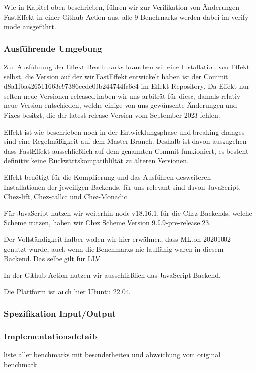Wie in %
Kapitel oben beschrieben, führen wir zur Verifikation von Änderungen FastEffekt in einer Github Action aus, alle 9 Benchmarks werden dabei im verify-mode ausgeführt. 

\subsubsection{Ausführende Umgebung}
Zur Ausführung der Effekt Benchmarks brauchen wir eine Installation von Effekt selbst, die Version auf der wir FastEffekt entwickelt haben ist der Commit d8a1fba426511663c97386eedc00b244744fa6e4 im Effekt Repository.
Da Effekt nur selten neue Versionen released haben wir uns arbiträt für diese, damals relativ neue Version entschieden, welche einige von uns gewünschte Änderungen und Fixes besitzt, die der latest-release Version vom September 2023 fehlen.

Effekt ist wie beschrieben noch in der Entwicklungsphase und breaking changes sind eine Regelmäßigkeit auf dem Master Branch. Deshalb ist davon auszugehen dass FastEffekt ausschließlich auf dem genannten Commit funkioniert, es besteht definitiv keine Rückwärtskompatibliltät zu älteren Versionen.

Effekt benötigt für die Kompilierung und das Ausführen desweiteren Installationen der jeweiligen Backends, für uns relevant sind davon JavaScript, Chez-lift, Chez-callcc und Chez-Monadic.

Für JavaScript nutzen wir weiterhin node v18.16.1, für die Chez-Backends, welche Scheme nutzen, haben wir Chez Scheme Version 9.9.9-pre-release.23.

Der Vollständigkeit halber wollen wir hier erwähnen, dass MLton 20201002 genutzt wurde, auch wenn die Benchmarks nie lauffähig waren in diesem Backend.
Das selbe gilt für LLV %

In der Github Action nutzen wir ausschließlich das JavaScript Backend.

Die Plattform ist auch hier Ubuntu 22.04.
\subsubsection{Spezifikation Input/Output}

\subsubsection{Implementationsdetails}
liste aller benchmarks mit besonderheiten und abweichung vom original benchmark



